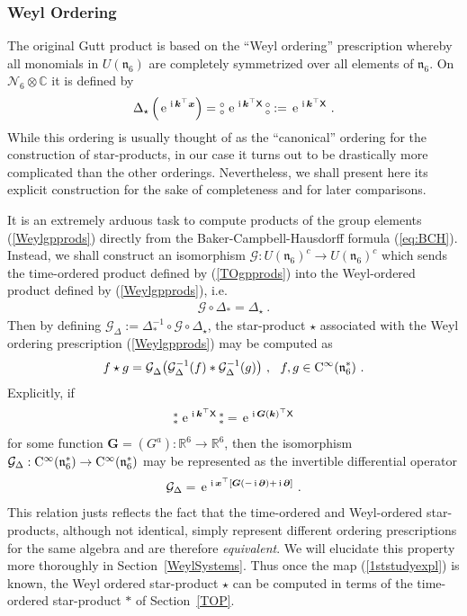 \documentclass[11pt,a4paper]{article}
\newcommand{\NO}{\mbox{$\substack{\circ\\\circ}$}}      %
\newcommand{\NOa}{\mbox{$\substack{\ast\\\ast}$}}       %
\newcommand{\ii}{{\rm i}}
\newcommand{\mbf}[1]{{\boldsymbol {#1} }}
\def\ii{{\,{\rm i}\,}}
\def\CC{{\rm C}}
\def\X{{\sf X}}
\def\mx{{\mbf x}}
\def\mk{{\mbf k}}
\def\mG{{\mbf G}}
\def\mfn{{\mathfrak n}}
\newcommand{\complex}{{\mathbb C}} %
\newcommand{\real}{{\mathbb R}} %
\def\e{{\,\rm e}\,}
\newcommand{\beq}{\begin{eqnarray}}
\newcommand{\eeq}{\end{eqnarray}}
\begin{document}
\subsubsection{Weyl Ordering\label{WOP}}

The original Gutt product is based on the ``Weyl ordering''
prescription whereby all monomials  in $U(\mfn_6)$ are completely
symmetrized over all elements of $\mfn_6$. On
$\mathcal{N}_6\otimes\complex$ it is defined by
\beq
\Delta_\star\left(\e^{\ii\mk^\top\mx}\right)=
\NO\,\e^{\ii\mk^\top\X}\,\NO:=\e^{\ii\mk^\top\X} \ .
\label{Weylgpprods}\eeq
While this ordering is usually thought of as the ``canonical''
ordering for the construction of star-products, in our case it turns
out to be drastically more complicated than the other
orderings. Nevertheless, we shall present here its explicit
construction for the sake of completeness and for later comparisons.

It is an extremely arduous task to compute products of the group
elements (\ref{Weylgpprods}) directly from the
Baker-Campbell-Hausdorff formula (\ref{eq:BCH}). Instead, we shall
construct an isomorphism $\mathcal{G}:U(\mfn_6)^c\to
U(\mfn_6)^c$ which sends the time-ordered product defined by
(\ref{TOgpprods}) into the Weyl-ordered product defined by
(\ref{Weylgpprods}), i.e.
\beq
\mathcal{G}\circ\Delta_*=\Delta_\star \ .
\label{1ststudy}\eeq
Then by defining
$\mathcal{G}_\Delta:=\Delta_*^{-1}\circ\mathcal{G}\circ\Delta^{~}_\star$,
the star-product $\star$ associated with the Weyl ordering
prescription (\ref{Weylgpprods}) may be computed as
\beq
f\star g=\mathcal{G}^{~}_\Delta\bigl(\mathcal{G}_\Delta^{-1}(f)*
\mathcal{G}_\Delta^{-1}(g)\bigr) \ , ~~ f,g\in\CC^\infty(\mfn_6^*) \ .
\label{WeylTOrel}\eeq
Explicitly, if
\beq
\NOa\,\e^{\ii\mk^\top\X}\,\NOa=\e^{\ii\mG(\mk)^\top\X}
\label{1ststudyexpl}\eeq
for some function $\mG=(G^a):\real^6\to\real^6$, then the isomorphism
$\mathcal{G}_\Delta:\CC^\infty(\mfn_6^*)\to\CC^\infty(\mfn_6^*)$ may
be represented as the invertible differential operator
\beq
\mathcal{G}_\Delta=\e^{\ii\mx^\top[\mG(-\ii\mbf\partial)+\ii\mbf
\partial]} \ .
\label{Gdiffop}\eeq
This relation justs reflects the fact that the time-ordered and
Weyl-ordered star-products, although not identical, simply represent different
ordering prescriptions for the same algebra and are therefore {\it
  equivalent}. We will elucidate this property more thoroughly in
Section~\ref{WeylSystems}. Thus once the map (\ref{1ststudyexpl}) is
known, the Weyl ordered star-product $\star$ can be computed in terms
of the time-ordered star-product $*$ of Section~\ref{TOP}.
\end{document}
